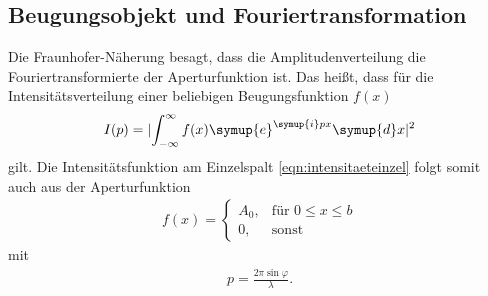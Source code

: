 \subsection{Beugungsobjekt und Fouriertransformation}

Die Fraunhofer-Näherung besagt, dass die Amplitudenverteilung die
Fouriertransformierte der Aperturfunktion ist.
Das heißt, dass für die Intensitätsverteilung einer beliebigen
Beugungsfunktion $f(x)$
\begin{align}
  I(p) = \lvert \int_{-\infty}^{\infty} f(x) \symup{e}^{\symup{i}px} \symup{d}x
  \rvert^2
\end{align}
gilt.
Die Intensitätsfunktion am Einzelspalt \eqref{eqn:intensitaeteinzel}
folgt somit auch aus der Aperturfunktion
\begin{align}
  f(x) =
  \begin{cases}
    A_0, & \text{für  } 0 \leq x \leq b \\
    0, & \text{sonst}
  \end{cases}
\end{align}
mit
\begin{align}
  p = \frac{2 \pi \sin{\varphi}}{\lambda}.
\end{align}
